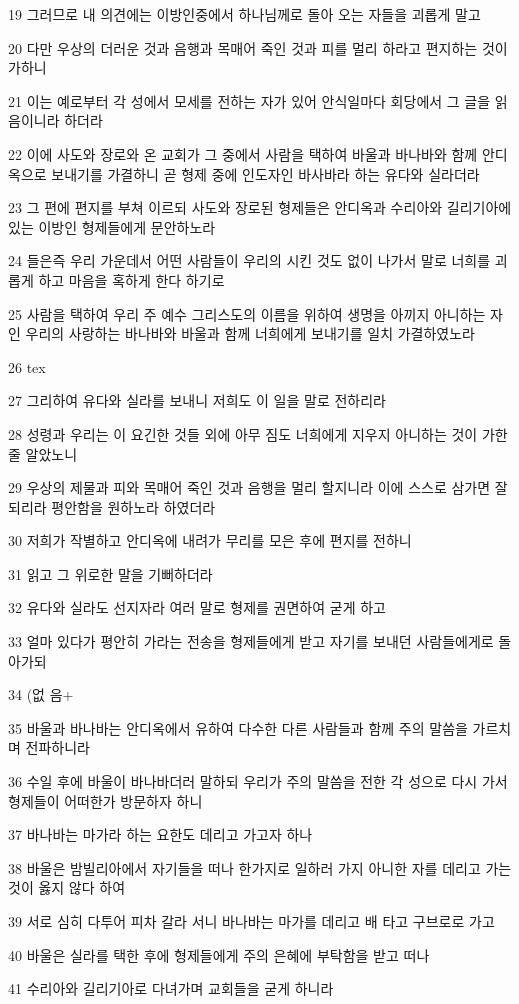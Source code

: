 \par 19 그러므로 내 의견에는 이방인중에서 하나님께로 돌아 오는 자들을 괴롭게 말고
\par 20 다만 우상의 더러운 것과 음행과 목매어 죽인 것과 피를 멀리 하라고 편지하는 것이 가하니
\par 21 이는 예로부터 각 성에서 모세를 전하는 자가 있어 안식일마다 회당에서 그 글을 읽음이니라 하더라
\par 22 이에 사도와 장로와 온 교회가 그 중에서 사람을 택하여 바울과 바나바와 함께 안디옥으로 보내기를 가결하니 곧 형제 중에 인도자인 바사바라 하는 유다와 실라더라
\par 23 그 편에 편지를 부쳐 이르되 사도와 장로된 형제들은 안디옥과 수리아와 길리기아에 있는 이방인 형제들에게 문안하노라
\par 24 들은즉 우리 가운데서 어떤 사람들이 우리의 시킨 것도 없이 나가서 말로 너희를 괴롭게 하고 마음을 혹하게 한다 하기로
\par 25 사람을 택하여 우리 주 예수 그리스도의 이름을 위하여 생명을 아끼지 아니하는 자인 우리의 사랑하는 바나바와 바울과 함께 너희에게 보내기를 일치 가결하였노라
\par 26 tex
\par 27 그리하여 유다와 실라를 보내니 저희도 이 일을 말로 전하리라
\par 28 성령과 우리는 이 요긴한 것들 외에 아무 짐도 너희에게 지우지 아니하는 것이 가한줄 알았노니
\par 29 우상의 제물과 피와 목매어 죽인 것과 음행을 멀리 할지니라 이에 스스로 삼가면 잘되리라 평안함을 원하노라 하였더라
\par 30 저희가 작별하고 안디옥에 내려가 무리를 모은 후에 편지를 전하니
\par 31 읽고 그 위로한 말을 기뻐하더라
\par 32 유다와 실라도 선지자라 여러 말로 형제를 권면하여 굳게 하고
\par 33 얼마 있다가 평안히 가라는 전송을 형제들에게 받고 자기를 보내던 사람들에게로 돌아가되
\par 34 (없 음+
\par 35 바울과 바나바는 안디옥에서 유하여 다수한 다른 사람들과 함께 주의 말씀을 가르치며 전파하니라
\par 36 수일 후에 바울이 바나바더러 말하되 우리가 주의 말씀을 전한 각 성으로 다시 가서 형제들이 어떠한가 방문하자 하니
\par 37 바나바는 마가라 하는 요한도 데리고 가고자 하나
\par 38 바울은 밤빌리아에서 자기들을 떠나 한가지로 일하러 가지 아니한 자를 데리고 가는 것이 옳지 않다 하여
\par 39 서로 심히 다투어 피차 갈라 서니 바나바는 마가를 데리고 배 타고 구브로로 가고
\par 40 바울은 실라를 택한 후에 형제들에게 주의 은혜에 부탁함을 받고 떠나
\par 41 수리아와 길리기아로 다녀가며 교회들을 굳게 하니라

